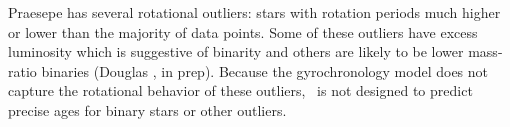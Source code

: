 Praesepe has several rotational outliers: stars with rotation periods much
higher or lower than the majority of data points.
Some of these outliers have excess luminosity which is suggestive of binarity
and others are likely to be lower mass-ratio binaries (Douglas \etal, in prep).
Because the gyrochronology model does not capture the rotational behavior of
these outliers, \sd\ is not designed to predict precise ages for binary stars
or other outliers.

